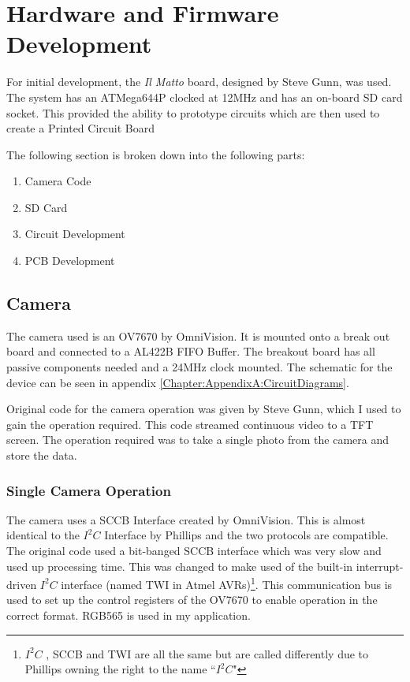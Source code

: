 \chapter{Hardware and Firmware Development} \label{Chapter:HardwareDevelopment}
For initial development, the \textit{Il Matto} board, designed by Steve Gunn, was used. The system has an ATMega644P clocked at 12MHz and has an on-board SD card socket. This provided the ability to prototype circuits which are then used to create a Printed Circuit Board 

The following section is broken down into the following parts:
\begin{enumerate}
\item[\ref{Section:Camera}] Camera Code
\item[\ref{sect:SDCard}] SD Card
\item[\ref{Section:Circuit_Dev}] Circuit Development
\item[\ref{Section:PCB_Dev}] PCB Development
\end{enumerate}

\section{Camera} \label{Section:Camera}

The camera used is an OV7670 by OmniVision. It is mounted onto a break out board and connected to a AL422B FIFO Buffer. The breakout board has all passive components needed and a 24MHz clock mounted. The schematic for the device can be seen in appendix \ref{Chapter:AppendixA:CircuitDiagrams}.

Original code for the camera operation was given by Steve Gunn, which I used to gain the operation required. This code streamed continuous video to a TFT screen. The operation required was to take a single photo from the camera and store the data. 

\subsection{Single Camera Operation}

The camera uses a SCCB Interface \citep{SCCB_Interface} created by OmniVision. This is almost identical to the $I^{2}C$ Interface by Phillips and the two protocols are compatible. The original code used a bit-banged SCCB interface which was very slow and used up processing time. This was changed to make used of the built-in interrupt-driven $I^{2}C$ interface (named TWI in Atmel AVRs)\footnote{$I^{2}C$ , SCCB and TWI are all the same but are called differently due to Phillips owning the right to the name ``$I^{2}C$"}. This communication bus is used to set up the control registers of the OV7670 to enable operation in the correct format. RGB565 is used in my application.

